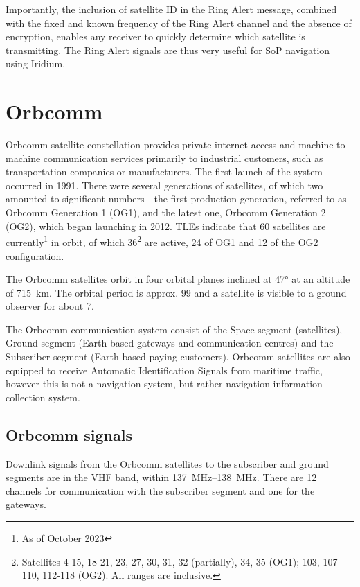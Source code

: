 Importantly, the inclusion of satellite ID in the Ring Alert message, combined with the fixed and known frequency of the Ring Alert channel and the absence of encryption, enables any receiver to quickly determine which satellite is transmitting. The Ring Alert signals are thus very useful for SoP navigation using Iridium.


\section{Orbcomm}
Orbcomm satellite constellation provides private internet access and machine-to-machine communication services primarily to industrial customers, such as transportation companies or manufacturers. The first launch of the system occurred in 1991. There were several generations of satellites, of which two amounted to significant numbers - the first production generation, referred to as Orbcomm Generation 1 (OG1), and the latest one, Orbcomm Generation 2 (OG2), which began launching in 2012. TLEs indicate that 60 satellites are currently\footnote{As of October 2023} in orbit, of which 36\footnote{Satellites 4-15, 18-21, 23, 27, 30, 31, 32 (partially), 34, 35 (OG1); 103, 107-110, 112-118 (OG2). All ranges are inclusive.} are active, 24 of OG1 and 12 of the OG2 configuration\cite{sat12}.

The Orbcomm satellites orbit in four orbital planes inclined at \ang{47} at an altitude of \qty{715}{km}. The orbital period is approx. \qty{99}{\min} and a satellite is visible to a ground observer for about \qty{7}{\min}\cite{sat11, sop08}. %

The Orbcomm communication system consist of the Space segment (satellites), Ground segment (Earth-based gateways and communication centres) and the Subscriber segment (Earth-based paying customers)\cite{sop08}. Orbcomm satellites are also equipped to receive Automatic Identification Signals from maritime traffic, however this is not a navigation system, but rather navigation information collection system\cite{sat11}.

\subsection{Orbcomm signals}
Downlink signals from the Orbcomm satellites to the subscriber and ground segments are in the VHF band, within \qtyrange{137}{138}{MHz}. There are 12 channels for communication with the subscriber segment and one for the gateways\cite{sop08}.

